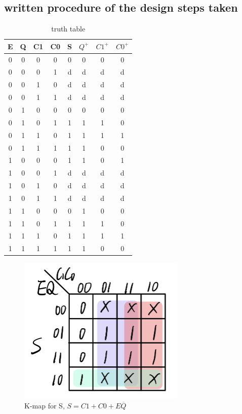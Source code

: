 \documentclass[12pt]{article}
\begin{document}
\subsection{written procedure of the design steps taken}
\begin{table}[H]
    \centering
    \begin{tabular}{|cccc|cccc|}
    \hline
    E & Q & C1 & C0 & S & $Q^+$ & $C1^+$ & $C0^+$ \\ \hline
    0 & 0 & 0  & 0  & 0 & 0     & 0      & 0      \\
    0 & 0 & 0  & 1  & d & d     & d      & d      \\
    0 & 0 & 1  & 0  & d & d     & d      & d      \\
    0 & 0 & 1  & 1  & d & d     & d      & d      \\ \hline
    0 & 1 & 0  & 0  & 0 & 0     & 0      & 0      \\
    0 & 1 & 0  & 1  & 1 & 1     & 1      & 0      \\
    0 & 1 & 1  & 0  & 1 & 1     & 1      & 1      \\
    0 & 1 & 1  & 1  & 1 & 1     & 0      & 0      \\ \hline
    1 & 0 & 0  & 0  & 1 & 1     & 0      & 1      \\
    1 & 0 & 0  & 1  & d & d     & d      & d      \\
    1 & 0 & 1  & 0  & d & d     & d      & d      \\
    1 & 0 & 1  & 1  & d & d     & d      & d      \\ \hline
    1 & 1 & 0  & 0  & 0 & 1     & 0      & 0      \\
    1 & 1 & 0  & 1  & 1 & 1     & 1      & 0      \\
    1 & 1 & 1  & 0  & 1 & 1     & 1      & 1      \\
    1 & 1 & 1  & 1  & 1 & 1     & 0      & 0      \\ \hline
    \end{tabular}
    \caption{truth table}
\end{table}
\begin{figure}[H]
    \centering
    \includegraphics[width=8cm]{S.png}
    \caption{K-map for S, $S=C1+C0+E\overline{Q}$}
\end{figure}
\end{document}
